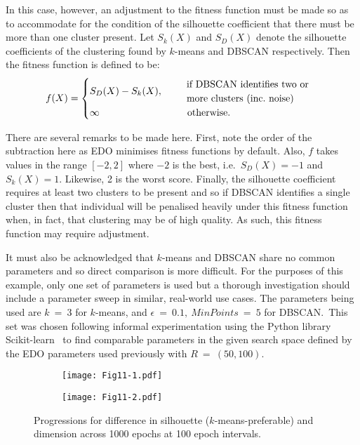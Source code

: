 In this case, however, an adjustment to the fitness function must be made so as
to accommodate for the condition of the silhouette coefficient that there must
be more than one cluster present. Let \(S_k (X)\) and \(S_D (X)\) denote the
silhouette coefficients of the clustering found by \(k\)-means and DBSCAN
respectively. Then the fitness function is defined to be:
\begin{equation}
    f(X) =
        \begin{cases}
            S_D (X) - S_k (X), &\quad \text{%
                \begin{tabular}{l}%
                    if DBSCAN identifies two or
                    \\
                    more clusters (inc.\ noise)
                \end{tabular}
            }\\
            \infty &\quad \ \ \text{otherwise.}
        \end{cases}\label{eq:dbscan-fitness}
\end{equation}

There are several remarks to be made here. First, note the order of the
subtraction here as EDO minimises fitness functions by default. Also, \(f\)
takes values in the range \([-2, 2]\) where \(-2\) is the best, i.e.\ \(S_D(X) =
-1\) and \(S_k(X) = 1\). Likewise, 2 is the worst score. Finally, the silhouette
coefficient requires at least two clusters to be present and so if DBSCAN
identifies a single cluster then that individual will be penalised heavily under
this fitness function when, in fact, that clustering may be of high quality. As
such, this fitness function may require adjustment.

It must also be acknowledged that \(k\)-means and DBSCAN share no common
parameters and so direct comparison is more difficult. For the purposes of this
example, only one set of parameters is used but a thorough investigation should
include a parameter sweep in similar, real-world use cases. The parameters being
used are \(k~=~3\) for \(k\)-means, and \(\epsilon~=~0.1,\ MinPoints~=~5\) for
DBSCAN.\ This set was chosen following informal experimentation using the Python
library Scikit-learn~\cite{scikit} to find comparable parameters in the given
search space defined by the EDO parameters used previously with
\(R~=~(50,100)\).

\begin{figure}
    \centering
    \begin{subfigure}{\imgwidth}
        \texttt{[image: Fig11-1.pdf]}
        \caption{}\label{fig:edo:positive:silhouette}
    \end{subfigure}

    \begin{subfigure}{\imgwidth}
        \texttt{[image: Fig11-2.pdf]}
        \caption{}\label{fig:edo:positive:dimension}
    \end{subfigure}
    \caption{%
        Progressions for difference in silhouette (\(k\)-means-preferable) and
        dimension across 1000 epochs at 100 epoch intervals.
    }\label{fig:dbscan-silhouette}
\end{figure}

